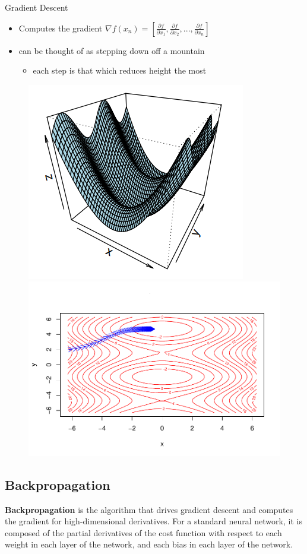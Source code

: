 Gradient Descent

\begin{itemize}
\tightlist
\item
  Computes the gradient 
$  
  \nabla f(x_n) =
  \left[ \frac{\partial f}{\partial x_1} , \frac{\partial f}{\partial x_2} , ... , \frac{\partial f}{\partial x_n} \right]
$
  
\item
  can be thought of as stepping down off a mountain

  \begin{itemize}
  \tightlist
  \item
    each step is that which reduces height the most
  \end{itemize}
\end{itemize}



\begin{figure}[H]
    \includegraphics[width = .4\textwidth]{Figures/grad_desc-51.png}
    \includegraphics[width = .6\textwidth]{Figures/grad_desc-50.pdf}
\end{figure}


\hypertarget{backpropagation}{%
\subsection{Backpropagation}\label{backpropagation}}

\textbf{Backpropagation} is the algorithm that drives gradient descent and computes the gradient for high-dimensional derivatives. For a standard neural network, it is composed of the partial derivatives of the cost function with respect to each weight in each layer of the network, and each bias in each layer of the network.

